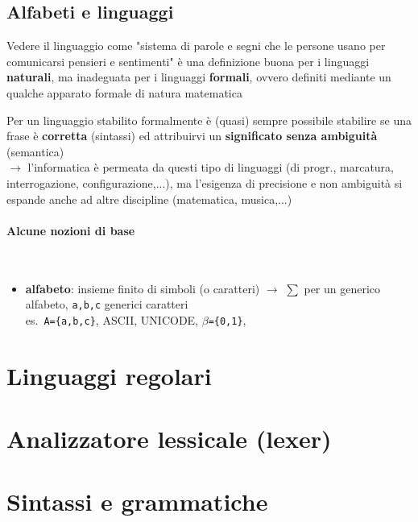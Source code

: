 \subsection{Alfabeti e linguaggi}

Vedere il linguaggio come "sistema di parole e segni che le persone usano per comunicarsi pensieri e sentimenti" \`e una definizione buona per i linguaggi \textbf{naturali}, ma inadeguata per i linguaggi \textbf{formali}, ovvero definiti mediante un qualche apparato formale di natura matematica

Per un linguaggio stabilito formalmente \`e (quasi) sempre possibile stabilire se una frase \`e \textbf{corretta} (sintassi) ed attribuirvi un \textbf{significato senza ambiguit\`a} (semantica)\\
$\rightarrow$ l'informatica \`e permeata da questi tipo di linguaggi (di progr., marcatura, interrogazione, configurazione,...), ma l'esigenza di precisione e non ambiguit\`a si espande anche ad altre discipline (matematica, musica,...)

\paragraph{Alcune nozioni di base}~\\

\begin{itemize}
  \item \textbf{alfabeto}: insieme finito di simboli (o caratteri) $\rightarrow$ $\sum$ per un generico alfabeto, \texttt{a,b,c} generici caratteri\\
    es.~\texttt{A=\{a,b,c\}}, ASCII, UNICODE, $\beta$\texttt{=\{0,1\}}, 
\end{itemize}

\section{Linguaggi regolari}
\section{Analizzatore lessicale (lexer)}
\section{Sintassi e grammatiche}


